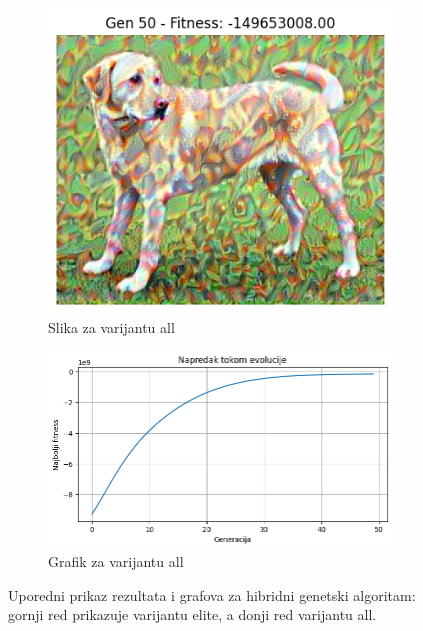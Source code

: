 \documentclass[a4paper,12pt]{article}
\begin{document}
\begin{figure}[h]
\begin{subfigure}{0.4\textwidth}
    \centering
    \includegraphics[width=\linewidth]{all1.png}
    \caption{Slika za varijantu all}
\end{subfigure}
\hfill
\begin{subfigure}{0.4\textwidth}
    \centering
    \includegraphics[width=\linewidth]{all1gr.png}
    \caption{Grafik za varijantu all}
\end{subfigure}

\caption{Uporedni prikaz rezultata i grafova za hibridni genetski algoritam: gornji red prikazuje varijantu elite, a donji red varijantu all.}
\end{figure}
\end{document}
